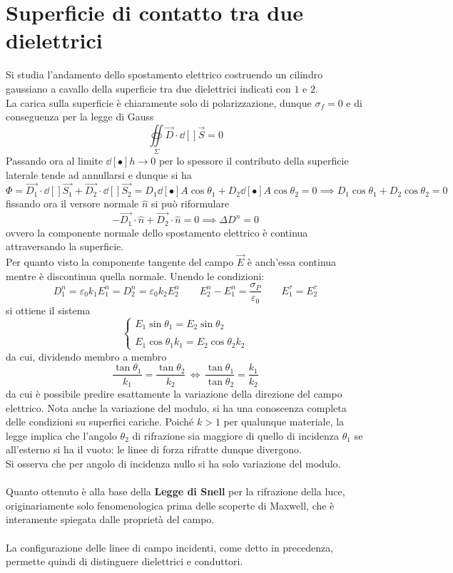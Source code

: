 \section{Superficie di contatto tra due dielettrici}
Si studia l'andamento dello spostamento elettrico costruendo un cilindro gaussiano a cavallo della superficie tra due dielettrici indicati con $1$ e $2$.
\\La carica sulla superficie è chiaramente solo di polarizzazione, dunque $\sigma_f = 0$ e di conseguenza per la legge di Gauss
\[\oiint\limits_\Sigma \vec{D} \cdot \dd[]{\vec{S}} = 0\]
Passando ora al limite $\dd[•]{h} \rightarrow 0$ per lo spessore il contributo della superficie laterale tende ad annullarsi e dunque si ha
\[\Phi = \vec{D_1} \cdot \dd[]{\vec{S_1}} + \vec{D_2} \cdot \dd[]{\vec{S_2}} = D_1 \dd[•]{A} \cos \theta_1 + D_2 \dd[•]{A} \cos \theta_2 = 0 \implies D_1 \cos \theta_1 + D_2 \cos \theta_2 = 0\]
fissando ora il versore normale $\hat{n}$ si può riformulare
\[- \vec{D_1} \cdot \hat{n} + \vec{D_2} \cdot \hat{n} = 0 \implies \Delta D^n = 0\]
ovvero la componente normale dello spostamento elettrico è continua attraversando la superficie.
\\Per quanto visto la componente tangente del campo $\vec{E}$ è anch'essa continua mentre è discontinua quella normale. Unendo le condizioni:
\[D_1^n = \varepsilon_0 k_1 E_1^n = D_2^n = \varepsilon_0 k_2 E_2^n \qquad E_2^n - E_1^n = \frac{\sigma_P}{\varepsilon_0} \qquad E_1^\tau = E_2^\tau\]
si ottiene il sistema
\[
\begin{cases}
E_1 \sin \theta_1 = E_2 \sin \theta_2 \\
\\
E_1 \cos \theta_1 k_1 = E_2 \cos \theta_2 k_2
\end{cases}
\]
da cui, dividendo membro a membro
\[\frac{\tan \theta_1}{k_1} = \frac{\tan \theta_2}{k_2} \, \Longleftrightarrow \, \frac{\tan \theta_1}{\tan \theta_2} = \frac{k_1}{k_2}\]
da cui è possibile predire esattamente la variazione della direzione del campo elettrico. Nota anche la variazione del modulo, si ha una conoscenza completa delle condizioni su superfici cariche. Poiché $k > 1$ per qualunque materiale, la legge implica che l'angolo $\theta_2$ di rifrazione sia maggiore di quello di incidenza $\theta_1$ se all'esterno si ha il vuoto: le linee di forza rifratte dunque divergono.
\\Si osserva che per angolo di incidenza nullo si ha solo variazione del modulo.
\\~\\
Quanto ottenuto è alla base della \textbf{Legge di Snell} per la rifrazione della luce, originariamente solo fenomenologica prima delle scoperte di Maxwell, che è interamente spiegata dalle proprietà del campo. 
\\~\\
La configurazione delle linee di campo incidenti, come detto in precedenza, permette quindi di distinguere dielettrici e conduttori.

